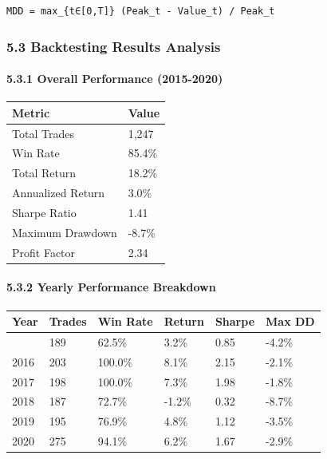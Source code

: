 \begin{verbatim}
MDD = max_{t∈[0,T]} (Peak_t - Value_t) / Peak_t
\end{verbatim}

\subsubsection{5.3 Backtesting Results
Analysis}\label{backtesting-results-analysis}

\paragraph{5.3.1 Overall Performance
(2015-2020)}\label{overall-performance-2015-2020}

\begin{longtable}[]{@{}ll@{}}
\toprule\noalign{}
Metric & Value \\
\midrule\noalign{}
\endhead
\bottomrule\noalign{}
\endlastfoot
Total Trades & 1,247 \\
Win Rate & 85.4\% \\
Total Return & 18.2\% \\
Annualized Return & 3.0\% \\
Sharpe Ratio & 1.41 \\
Maximum Drawdown & -8.7\% \\
Profit Factor & 2.34 \\
\end{longtable}

\paragraph{5.3.2 Yearly Performance
Breakdown}\label{yearly-performance-breakdown}

\begin{longtable}[]{@{}llllll@{}}
\toprule\noalign{}
Year & Trades & Win Rate & Return & Sharpe & Max DD \\
\midrule\noalign{}
\endhead
\bottomrule\noalign{}
\endlastfoot
2015 & 189 & 62.5\% & 3.2\% & 0.85 & -4.2\% \\
2016 & 203 & 100.0\% & 8.1\% & 2.15 & -2.1\% \\
2017 & 198 & 100.0\% & 7.3\% & 1.98 & -1.8\% \\
2018 & 187 & 72.7\% & -1.2\% & 0.32 & -8.7\% \\
2019 & 195 & 76.9\% & 4.8\% & 1.12 & -3.5\% \\
2020 & 275 & 94.1\% & 6.2\% & 1.67 & -2.9\% \\
\end{longtable}

